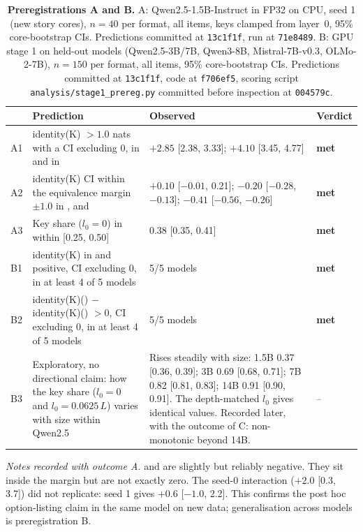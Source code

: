 \begin{table}[!ht]
\centering
\footnotesize
\caption{\textbf{Preregistrations A and B.} A: Qwen2.5-1.5B-Instruct in FP32 on CPU, seed 1 (new story cores), $n = 40$ per format, all items, keys clamped from layer~0, 95\% core-bootstrap CIs. Predictions committed at \texttt{13c1f1f}, run at \texttt{71e8489}. B: GPU stage 1 on held-out models (Qwen2.5-3B/7B, Qwen3-8B, Mistral-7B-v0.3, OLMo-2-7B), $n = 150$ per format, all items, 95\% core-bootstrap CIs. Predictions committed at \texttt{13c1f1f}, code at \texttt{f706ef5}, scoring script \texttt{analysis/stage1\_prereg.py} committed before inspection at \texttt{004579c}.}
\label{tab:prereg-ab}
\begin{tabular}{p{}p{}p{}p{}}
\toprule
 & Prediction & Observed & Verdict \\
\midrule
A1 & identity(K) $> 1.0$ nats with a CI excluding 0, in \fmtOpt{} and in \fmtLetter{} & \fmtOpt{} $+2.85$ [2.38, 3.33]; \fmtLetter{} $+4.10$ [3.45, 4.77] & \textbf{met} \\
A2 & identity(K) CI within the equivalence margin $\pm 1.0$ in \fmtNone{}, \fmtBefore{} and \fmtPost{} & \fmtNone{} $+0.10$ [$-0.01$, 0.21]; \fmtBefore{} $-0.20$ [$-0.28$, $-0.13$]; \fmtPost{} $-0.41$ [$-0.56$, $-0.26$] & \textbf{met} \\
A3 & Key share ($l_0 = 0$) in \fmtOpt{} within [0.25, 0.50] & 0.38 [0.35, 0.41] & \textbf{met} \\
\midrule
B1 & identity(K) in \fmtOpt{} and \fmtLetter{} positive, CI excluding 0, in at least 4 of 5 models & 5/5 models & \textbf{met} \\
B2 & identity(K)(\fmtOpt{}) $-$ identity(K)(\fmtNone{}) $> 0$, CI excluding 0, in at least 4 of 5 models & 5/5 models & \textbf{met} \\
B3 & Exploratory, no directional claim: how the \fmtOpt{} key share ($l_0 = 0$ and $l_0 = 0.0625\,L$) varies with size within Qwen2.5 & Rises steadily with size: 1.5B 0.37 [0.36, 0.39]; 3B 0.69 [0.68, 0.71]; 7B 0.82 [0.81, 0.83]; 14B 0.91 [0.90, 0.91]. The depth-matched $l_0$ gives identical values. Recorded later, with the outcome of C: non-monotonic beyond 14B. & -- \\
\bottomrule
\end{tabular}

\smallskip
\begin{minipage}{0.94\textwidth}
\footnotesize
\emph{Notes recorded with outcome A.} \fmtBefore{} and \fmtPost{} are slightly but reliably negative. They sit inside the margin but are not exactly zero. The seed-0 \fmtLetter{} interaction ($+2.0$ [0.3, 3.7]) did not replicate: seed 1 gives $+0.6$ [$-1.0$, 2.2]. This confirms the post hoc option-listing claim in the same model on new data; generalisation across models is preregistration B.


\end{minipage}
\end{table}
